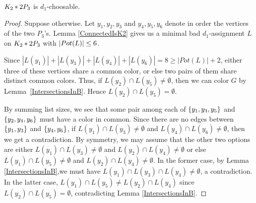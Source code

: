 
\begin{lem}
$K_2 \mbox{\hspace{2 pt}$\ast$\hspace{2 pt}} 2P_3$ is $d_1$-choosable.
\label{2P_3*K_2}
\end{lem}
\begin{proof}
Suppose otherwise. Let $y_1, y_2, y_3$ and $y_4, y_5, y_6$ denote in order the
vertices of the two $P_3$'s.  Lemma \ref{ConnectedIsK2} gives us a minimal bad
$d_1$-assignment $L$ on $K_2 \mbox{\hspace{2 pt}$\ast$\hspace{2 pt}} 2P_3$ with $\left|Pot(L)\right| \leq 6$.  

Since $|L(y_1)|+|L(y_3)|+|L(y_4)|+|L(y_6)|=8\ge |Pot(L)|+2$, either three of
these vertices share a common color, or else two pairs of them share distinct
common colors.
Thus, if $L(y_2) \cap L(y_5) \neq \emptyset$, then we can color $G$ by
Lemma~\ref{IntersectionsInB}.  Hence $L(y_2)\cap L(y_5)=\emptyset$.

By summing list sizes, we see that some pair among each of $\left\{ y_1, y_3,
y_5 \right\}$ and $\left\{ y_2, y_4, y_6 \right\}$ must have a color in common.  Since there are
no edges between $\left\{ y_1, y_3 \right\}$ and $\left\{ y_4, y_6 \right\}$, if $L(y_1) \cap L(y_3)
\neq \emptyset$ and $L(y_4) \cap L(y_6) \neq \emptyset$, then we get a
contradiction.
 By symmetry, we may assume that the other two options are either $L(y_1) \cap
L(y_3) \neq \emptyset$ and $L(y_2) \cap L(y_4) \neq \emptyset$ or else $L(y_1)
\cap L(y_5) \neq \emptyset$ and $L(y_2) \cap L(y_4) \neq \emptyset$.  In the
former case, by Lemma \ref{IntersectionsInB},we must have $L(y_1) \cap L(y_3)
\cap L(y_4) \neq \emptyset$, a contradiction.  In the latter case, $L(y_1) \cap
L(y_5) \neq L(y_2) \cap L(y_4)$ since $L(y_2) \cap L(y_5) = \emptyset$,
contradicting Lemma \ref{IntersectionsInB}.  \end{proof}



